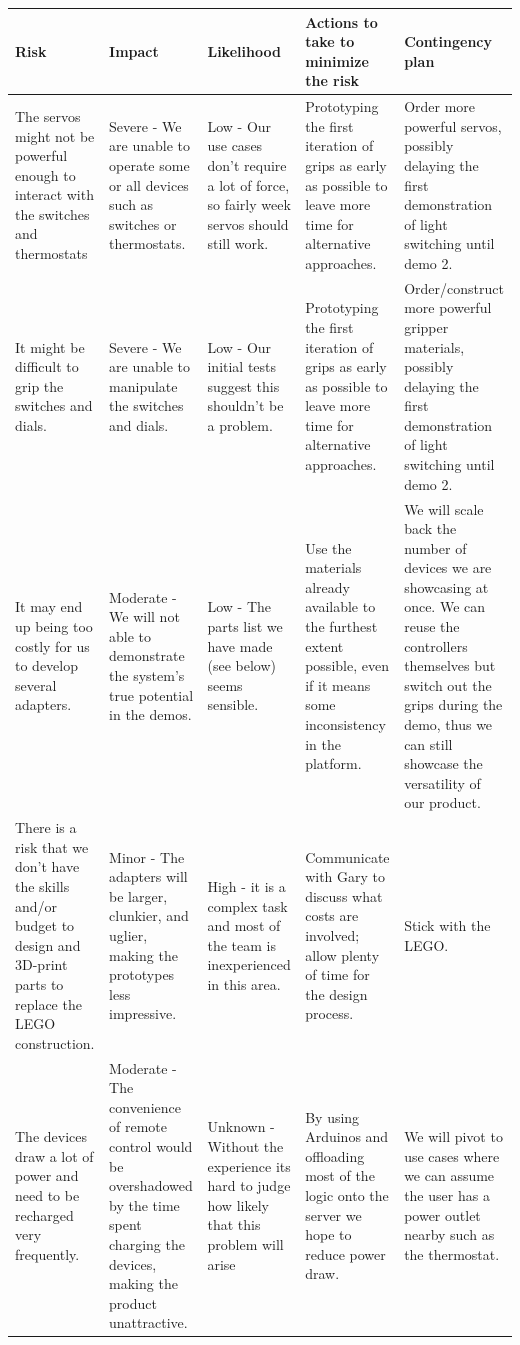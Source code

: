\documentclass[onecolumn]{IEEEtran}
\begin{document}
\begin{center}
    \begin{tabularx}{1.0\linewidth}{|L|L|L|L|L|}
        \hline
        \textbf{Risk} & \textbf{Impact} & \textbf{Likelihood} & \textbf{Actions to take to minimize the risk} & \textbf{Contingency plan} \\
        \hline
        The servos might not be powerful enough to interact with the switches and thermostats & Severe - We are unable to operate some or all devices such as switches or thermostats. & Low - Our use cases don't require a lot of force, so fairly week servos should still work. & Prototyping the first iteration of grips as early as possible to leave more time for alternative approaches. & Order more powerful servos, possibly delaying the first demonstration of light switching until demo 2. \\
        \hline
        It might be difficult to grip the switches and dials. & Severe - We are unable to manipulate the switches and dials. & Low - Our initial tests suggest this shouldn't be a problem. & Prototyping the first iteration of grips as early as possible to leave more time for alternative approaches. & Order/construct more powerful gripper materials, possibly delaying the first demonstration of light switching until demo 2. \\
        \hline
        It may end up being too costly for us to develop several adapters. & Moderate - We will not able to demonstrate the system’s true potential in the demos. & Low - The parts list we have made (see below) seems sensible. & Use the materials already available to the furthest extent possible, even if it means some inconsistency in the platform. & We will scale back the number of devices we are showcasing at once. We can reuse the controllers themselves but switch out the grips during the demo, thus we can still showcase the versatility of our product. \\
        \hline
        There is a risk that we don’t have the skills and/or budget to design and 3D-print parts to replace the LEGO construction. & Minor - The adapters will be larger, clunkier, and uglier, making the prototypes less impressive. & High - it is a complex task and most of the team is inexperienced in this area. & Communicate with Gary to discuss what costs are involved; allow plenty of time for the design process. & Stick with the LEGO. \\
        \hline
        The devices draw a lot of power and need to be recharged very frequently. & Moderate - The convenience of remote control would be overshadowed by the time spent charging the devices, making the product unattractive. & Unknown - Without the experience its hard to judge how likely that this problem will arise & By using Arduinos and offloading most of the logic onto the server we hope to reduce power draw. & We will pivot to use cases where we can assume the user has a power outlet nearby such as the thermostat. \\

\end{tabularx}
\end{center}
\end{document}
